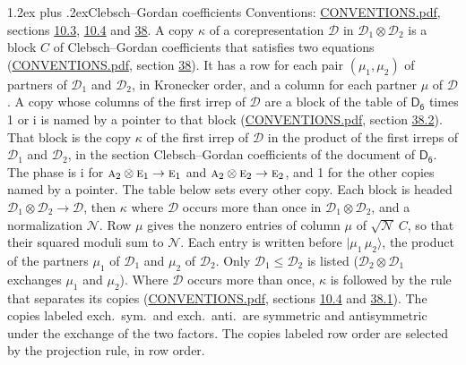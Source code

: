 \documentclass[10pt,a4paper]{article}
\makeatletter
\renewcommand\section{\@startsection{section}{1}{\z@}{-3ex plus -1ex minus -.2ex}%
  {1.2ex plus .2ex}{\normalfont\large\sffamily\bfseries\color{parttitle}}}
\numberwithin{equation}{section}
\newcommand{\grp}[1]{\mathsf{#1}}
\newcommand{\irr}[1]{\text{\normalfont\scshape #1}}
\newcommand{\iunit}{\mathrm{i}}
\newcommand{\irrprod}{\otimes}
\newcommand{\mult}{\kappa}
\newcommand{\intx}{\mu}
\newcommand{\cgnorm}{\mathcal{N}}
\newcommand{\prodket}[2]{\lvert {#1}\,{#2}\rangle}
\makeatother
\begin{document}
\section{Clebsch--Gordan coefficients}\label{s:clebsch_gordan}
Conventions: \href{../../CONVENTIONS.pdf}{CONVENTIONS.pdf}, sections \href{../../../rotation/CONVENTIONS.pdf\#conv.10.3}{10.3}, \href{../../../rotation/CONVENTIONS.pdf\#conv.10.4}{10.4} and \href{../../CONVENTIONS.pdf\#conv.38}{38}.
\leavevmode\label{n:index.copy}\label{n:matrix.cg.stored}A copy $\mult$ of a corepresentation $\mathcal{D}$ in $\mathcal{D}_1\irrprod\mathcal{D}_2$ is a block $C$ of Clebsch--Gordan coefficients that satisfies two equations (\href{../../CONVENTIONS.pdf}{CONVENTIONS.pdf}, section \href{../../CONVENTIONS.pdf\#conv.38}{38}). \label{n:index.cg}It has a row for each pair $(\intx_1, \intx_2)$ of partners of $\mathcal{D}_1$ and $\mathcal{D}_2$, in Kronecker order, and a column for each partner $\intx$ of $\mathcal{D}$.
A copy whose columns of the first irrep of $\mathcal{D}$ are a block of the table of $\grp{D_{6}}$ times 1 or $\iunit$ is named by a pointer to that block (\href{../../CONVENTIONS.pdf}{CONVENTIONS.pdf}, section \href{../../CONVENTIONS.pdf\#conv.38.2}{38.2}). That block is the copy $\mult$ of the first irrep of $\mathcal{D}$ in the product of the first irreps of $\mathcal{D}_1$ and $\mathcal{D}_2$, in the section Clebsch--Gordan coefficients of the document of \href{../../../rotation/data/pdf/D6.pdf}{$\grp{D_{6}}$}. The phase is $\iunit$ for $\irr{a}_{2}\irrprod \irr{e}_{1}\to \irr{e}_{1}$ and $\irr{a}_{2}\irrprod \irr{e}_{2}\to \irr{e}_{2}$, and 1 for the other copies named by a pointer. The table below sets every other copy.
Each block is headed $\mathcal{D}_1\irrprod\mathcal{D}_2\to\mathcal{D}$, then $\mult$ where $\mathcal{D}$ occurs more than once in $\mathcal{D}_1\irrprod\mathcal{D}_2$, and a normalization $\cgnorm$. Row $\intx$ gives the nonzero entries of column $\intx$ of $\sqrt{\cgnorm}\,C$, so that their squared moduli sum to $\cgnorm$. \label{n:vector.ket.product}Each entry is written before $\prodket{\intx_1}{\intx_2}$, the product of the partners $\intx_1$ of $\mathcal{D}_1$ and $\intx_2$ of $\mathcal{D}_2$. Only $\mathcal{D}_1 \le \mathcal{D}_2$ is listed ($\mathcal{D}_2\irrprod\mathcal{D}_1$ exchanges $\intx_1$ and $\intx_2$).
Where $\mathcal{D}$ occurs more than once, $\mult$ is followed by the rule that separates its copies (\href{../../CONVENTIONS.pdf}{CONVENTIONS.pdf}, sections \href{../../../rotation/CONVENTIONS.pdf\#conv.10.4}{10.4} and \href{../../CONVENTIONS.pdf\#conv.38.1}{38.1}). \label{n:abbreviation.exchange}The copies labeled exch.\ sym.\ and exch.\ anti.\ are symmetric and antisymmetric under the exchange of the two factors. The copies labeled row order are selected by the projection rule, in row order.
\end{document}
